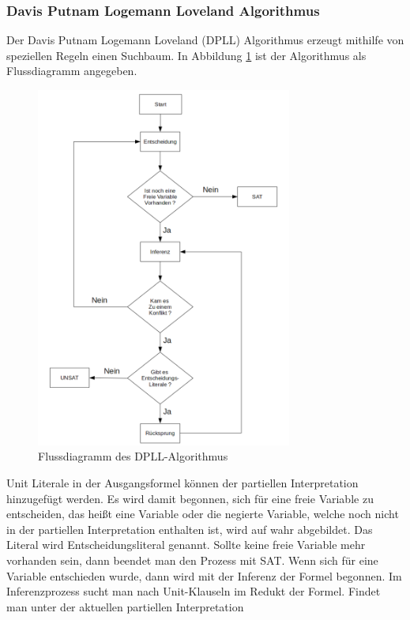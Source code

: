 \subsubsection{Davis Putnam Logemann Loveland Algorithmus}
Der Davis Putnam Logemann Loveland (DPLL) Algorithmus
erzeugt mithilfe von speziellen Regeln einen Suchbaum.
In Abbildung \ref{dpll} ist der Algorithmus als Flussdiagramm
angegeben. 
 \begin{figure}[h!]
    \centering
    \includegraphics[width=0.75\textwidth]{abb/dpll.png}
    \caption{Flussdiagramm des DPLL-Algorithmus}
    \label{dpll}
  \end{figure}
Unit Literale in der Ausgangsformel
können der partiellen Interpretation hinzugefügt werden.
Es wird damit begonnen, sich für eine freie Variable
zu entscheiden, das heißt eine Variable oder die negierte
Variable, welche noch nicht in der partiellen Interpretation
enthalten ist, wird auf wahr abgebildet. Das Literal wird 
Entscheidungsliteral genannt. Sollte keine freie
Variable mehr vorhanden sein, dann beendet man den Prozess
mit SAT. Wenn sich für eine Variable entschieden wurde, dann 
wird mit der Inferenz der Formel begonnen. Im Inferenzprozess 
sucht man nach Unit-Klauseln im Redukt der Formel. Findet
man unter der aktuellen partiellen Interpretation
